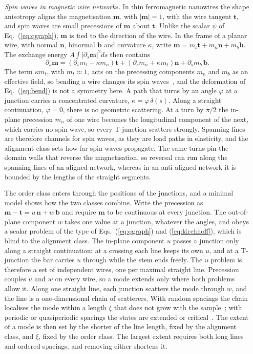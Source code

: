 \documentclass[aps,prl,onecolumn,superscriptaddress,amsmath,amssymb,floatfix]{revtex4-2}
\begin{document}
\textit{Spin waves in magnetic wire networks.} In thin ferromagnetic nanowires the shape
anisotropy aligns the magnetisation $\mathbf m$, with $|\mathbf m|=1$, with the wire tangent
$\mathbf t$, and spin waves are small precessions of $\mathbf m$ about $\mathbf t$. Unlike the
scalar $\psi$ of Eq.~(\ref{eq:qgraph}), $\mathbf m$ is tied to the direction of the wire. In the
frame of a planar wire, with normal $\mathbf n$, binormal $\mathbf b$ and curvature $\kappa$,
write $\mathbf m=m_t\mathbf t+m_n\mathbf n+m_b\mathbf b$. The exchange energy
$A\int|\partial_s\mathbf m|^2ds$ then contains
\begin{equation}
\partial_s\mathbf m=\left(\partial_s m_t-\kappa m_n\right)\mathbf t
+\left(\partial_s m_n+\kappa m_t\right)\mathbf n+\partial_s m_b\,\mathbf b .
\label{eq:frenet}
\end{equation}
The term $\kappa m_t$, with $m_t\approx1$, acts on the precessing components $m_n$ and $m_b$ as
an effective field, so bending a wire changes its spin waves~\cite{gaididei2014,sheka2015}, and
the deformation of Eq.~(\ref{eq:bend}) is not a symmetry here. A path that turns by an angle
$\varphi$ at a junction carries a concentrated curvature, $\kappa=\varphi\,\delta(s)$. Along a
straight continuation, $\varphi=0$, there is no geometric scattering. At a turn by $\pi/2$ the
in-plane precession $m_n$ of one wire becomes the longitudinal component of the next, which
carries no spin wave, so every T-junction scatters strongly. Spanning lines are therefore channels
for spin waves, as they are load paths in elasticity, and the alignment class sets how far spin
waves propagate. The same turns pin the domain walls that reverse the magnetisation, so reversal
can run along the spanning lines of an aligned network, whereas in an anti-aligned network it is
bounded by the lengths of the straight segments.

The order class enters through the positions of the junctions, and a minimal model shows how the
two classes combine. Write the precession as $\mathbf m-\mathbf t=u\,\mathbf n+w\,\mathbf b$ and
require $\mathbf m$ to be continuous at every junction. The out-of-plane component $w$ takes one
value at a junction, whatever the angles, and obeys a scalar problem of the type of
Eqs.~(\ref{eq:qgraph}) and (\ref{eq:kirchhoff}), which is blind to the alignment class. The
in-plane component $u$ passes a junction only along a straight continuation: at a crossing each
line keeps its own $u$, and at a T-junction the bar carries $u$ through while the stem ends
freely. The $u$ problem is therefore a set of independent wires, one per maximal straight line.
Precession couples $u$ and $w$ on every wire, so a mode extends only where both problems allow it.
Along one straight line, each junction scatters the mode through $w$, and the line is a
one-dimensional chain of scatterers. With random spacings the chain localises the mode within a
length $\xi$ that does not grow with the sample~\cite{ishii1973}; with periodic or quasiperiodic
spacings the states are extended or critical~\cite{kohmoto1983}. The extent of a mode is then set
by the shorter of the line length, fixed by the alignment class, and $\xi$, fixed by the order
class. The largest extent requires both long lines and ordered spacings, and removing either
shortens it.
\end{document}
